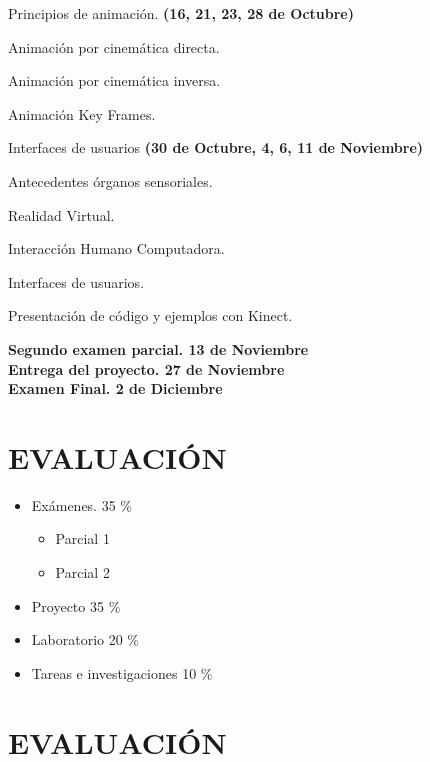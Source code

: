 \documentclass[a4paper,11pt]{article}
\theoremstyle{mytheor}
\begin{document}
\begin{legal}
\begin{legal}
	\end{legal}
	\item Principios de animación. \textbf{(16, 21, 23, 28 de Octubre)}
	\begin{legal}
		\item Animación por cinemática directa.
		\item Animación por cinemática inversa.
		\item Animación Key Frames.
	\end{legal}
	\item Interfaces de usuarios \textbf{(30 de Octubre, 4, 6, 11 de Noviembre)}
	\begin{legal}
		\item Antecedentes órganos sensoriales.
		\item Realidad Virtual.
		\item Interacción Humano Computadora.
		\item Interfaces de usuarios.
		\item Presentación de código y ejemplos con Kinect.
	\end{legal}
	\textbf{Segundo examen parcial. 13 de Noviembre}
	\\ \textbf{Entrega del proyecto. 27 de Noviembre }
	\\ \textbf{Examen Final. 2 de Diciembre}
	
\end{legal}

\section*{EVALUACIÓN}

\begin{itemize}
	\item Exámenes.	35 \%
	\begin{itemize}
		\item Parcial 1
		\item Parcial 2
	\end{itemize}
	\item Proyecto 35 \%
	\item Laboratorio 20 \%
	\item Tareas e investigaciones 10 \%
\end{itemize}

\section*{EVALUACIÓN}
\end{document}
